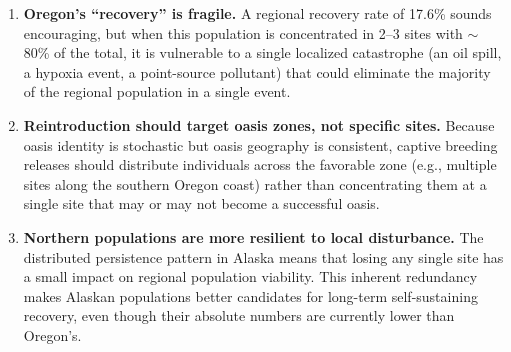 \begin{enumerate}
  \item \textbf{Oregon's ``recovery'' is fragile.}  A regional recovery
    rate of 17.6\% sounds encouraging, but when this population is
    concentrated in 2--3 sites with $\sim$80\% of the total, it is
    vulnerable to a single localized catastrophe (an oil spill, a hypoxia
    event, a point-source pollutant) that could eliminate the majority
    of the regional population in a single event.

  \item \textbf{Reintroduction should target oasis zones, not specific
    sites.}  Because oasis identity is stochastic but oasis geography is
    consistent, captive breeding releases should distribute individuals
    across the favorable zone (e.g., multiple sites along the southern
    Oregon coast) rather than concentrating them at a single site that
    may or may not become a successful oasis.

  \item \textbf{Northern populations are more resilient to local
    disturbance.}  The distributed persistence pattern in Alaska means
    that losing any single site has a small impact on regional population
    viability.  This inherent redundancy makes Alaskan populations better
    candidates for long-term self-sustaining recovery, even though their
    absolute numbers are currently lower than Oregon's.
\end{enumerate}
